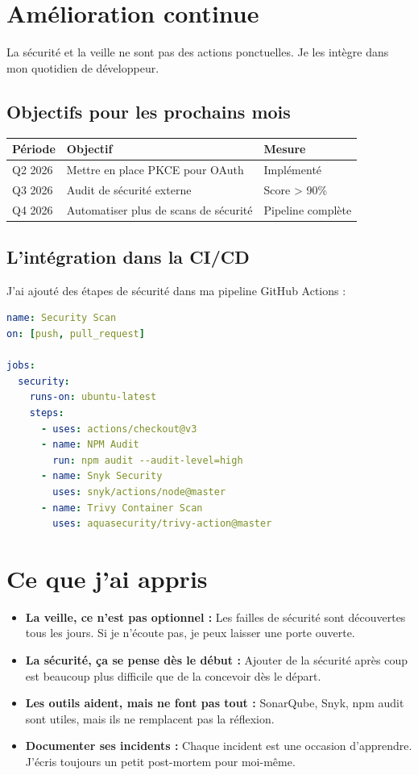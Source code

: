 \section{Amélioration continue}

La sécurité et la veille ne sont pas des actions ponctuelles. Je les intègre dans mon quotidien de développeur.

\subsection{Objectifs pour les prochains mois}

\begin{center}
\begin{tabular}{|l|l|l|}
\hline
\textbf{Période} & \textbf{Objectif} & \textbf{Mesure} \\
\hline
Q2 2026 & Mettre en place PKCE pour OAuth & Implémenté \\
Q3 2026 & Audit de sécurité externe & Score > 90\% \\
Q4 2026 & Automatiser plus de scans de sécurité & Pipeline complète \\
\hline
\end{tabular}
\end{center}

\subsection{L'intégration dans la CI/CD}

J'ai ajouté des étapes de sécurité dans ma pipeline GitHub Actions :

\begin{lstlisting}[language=yaml]
name: Security Scan
on: [push, pull_request]

jobs:
  security:
    runs-on: ubuntu-latest
    steps:
      - uses: actions/checkout@v3
      - name: NPM Audit
        run: npm audit --audit-level=high
      - name: Snyk Security
        uses: snyk/actions/node@master
      - name: Trivy Container Scan
        uses: aquasecurity/trivy-action@master
\end{lstlisting}

\section{Ce que j'ai appris}

\begin{itemize}
    \item \textbf{La veille, ce n'est pas optionnel :} Les failles de sécurité sont découvertes tous les jours. Si je n'écoute pas, je peux laisser une porte ouverte.
    \item \textbf{La sécurité, ça se pense dès le début :} Ajouter de la sécurité après coup est beaucoup plus difficile que de la concevoir dès le départ.
    \item \textbf{Les outils aident, mais ne font pas tout :} SonarQube, Snyk, npm audit sont utiles, mais ils ne remplacent pas la réflexion.
    \item \textbf{Documenter ses incidents :} Chaque incident est une occasion d'apprendre. J'écris toujours un petit post-mortem pour moi-même.
\end{itemize}